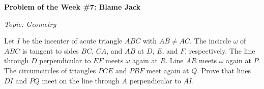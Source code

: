 \begin{potw}\vspace{5pt}
{\large\textbf{Problem of the Week \#7: Blame Jack}}\vspace{5pt}

\textit{Topic: Geometry}\V

Let $I$ be the incenter of acute triangle $ABC$ with $AB \neq AC$. The incircle $\omega$ of $ABC$ is tangent to sides $BC$, $CA$, and $AB$ at $D$, $E$, and $F$, respectively. The line through $D$ perpendicular to $EF$ meets $\omega$ again at $R$. Line $AR$ meets $\omega$ again at $P$. The circumcircles of triangles $PCE$ and $PBF$ meet again at $Q$. Prove that lines $DI$ and $PQ$ meet on the line through $A$ perpendicular to $AI$.
\end{potw}\V
